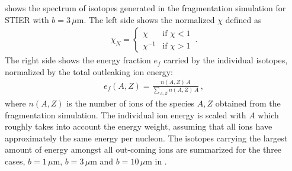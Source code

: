  shows the spectrum of isotopes generated in the fragmentation simulation for STIER with \mbox{$b=3\,\mu$m}. The left side shows the normalized $\chi$ defined as
\begin{align} 
\chi_N=\begin{cases} \chi & \text{if } \chi<1 \\ \chi^{-1} & \text{if } \chi>1 \end{cases} \, . \label{eq:normalized_chi}
\end{align}
The right side shows the energy fraction $e_f$ carried by the individual isotopes, normalized by the total outleaking ion energy:
\begin{align}
e_f(A,Z) = \frac{n(A,Z) \, A }{\sum_{A,Z} n(A,Z) \, A} \,, \label{eq:energyfraction}
\end{align}
where $n(A,Z)$ is the number of ions of the species $A,Z$ obtained from the fragmentation simulation. The individual ion energy is scaled with $A$ which roughly takes into account the energy weight, assuming that all ions have approximately the same energy per nucleon. The isotopes carrying the largest amount of energy amongst all out-coming ions are summarized for the three cases, $b=1\,\mu$m, $b=3\,\mu$m and $b=10\,\mu$m in .

